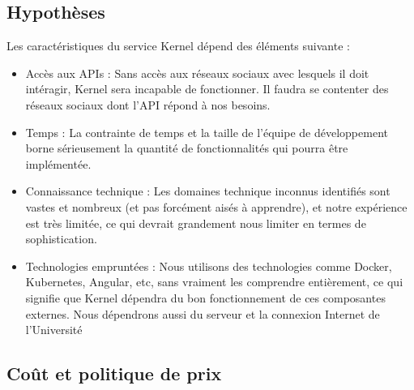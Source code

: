 \documentclass[11pt]{article}
\begin{document}
\subsection{Hypothèses}


Les caractéristiques du service Kernel dépend des éléments suivante :
\begin{itemize}
	\item Accès aux APIs : Sans accès aux réseaux sociaux avec lesquels il doit intéragir, Kernel sera incapable de fonctionner. Il faudra se contenter des réseaux sociaux dont l'API répond à nos besoins.
	
	\item Temps : La contrainte de temps et la taille de l'équipe de développement borne sérieusement la quantité de fonctionnalités qui pourra être implémentée.
	
	\item Connaissance technique : Les domaines technique inconnus identifiés sont vastes et nombreux (et pas forcément aisés à apprendre), et notre expérience est très limitée, ce qui devrait grandement nous limiter en termes de sophistication.
	
	\item Technologies empruntées : Nous utilisons des technologies comme Docker, Kubernetes, Angular, etc, sans vraiment les comprendre entièrement, ce qui signifie que Kernel dépendra du bon fonctionnement de ces composantes externes. Nous dépendrons aussi du serveur et la connexion Internet de l'Université
\end{itemize}

\subsection{Coût et politique de prix}

\end{document}
